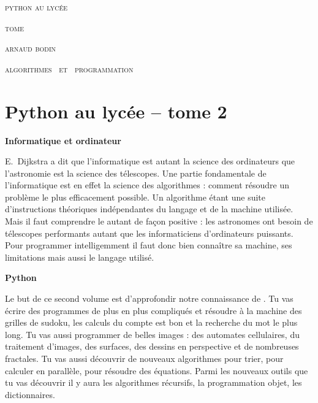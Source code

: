 
\pagestyle{empty}\thispagestyle{empty}
\vspace*{\fill}
\vspace*{5ex}
\begin{center}
	\fontsize{40}{40}\selectfont
	\textsc{python au lycée}
	
	\vspace*{-0.5ex}
	\textsc{\fontsize{24}{24}\selectfont tome \fontsize{22}{22}}
	
	\vspace*{2ex}
	
	\Large
	\textsc{arnaud bodin}

\end{center}
\vfill
\begin{center}
	\Large
	\textsc{algorithmes \  et \  programmation}
\end{center}
\begin{center}
\end{center}
\clearpage

\thispagestyle{empty}

\vspace*{\fill}
\section*{Python au lycée -- tome 2}



{\large\textbf{Informatique et ordinateur}}

E.~Dijkstra a dit que \og{}l'informatique est autant la science des ordinateurs que l'astronomie est la science des télescopes\fg{}. 
Une partie fondamentale de l'informatique est en effet la science des algorithmes :
comment résoudre un problème le plus efficacement possible.
Un algorithme étant une suite d'instructions théoriques indépendantes du langage et de la machine utilisée.
Mais il faut comprendre le \og{}autant\fg{} de façon positive : les astronomes ont besoin de télescopes performants  autant que les informaticiens d'ordinateurs puissants. Pour programmer intelligemment il faut donc bien connaître sa machine, ses limitations mais aussi le langage utilisé.

 
\bigskip

{\large\textbf{Python}}

Le but de ce second volume est d'approfondir notre connaissance de \Python{}. Tu vas écrire des programmes de plus en plus compliqués et résoudre à la machine des grilles de sudoku, les calculs du \og{}compte est bon\fg{} et la recherche du \og{}mot le plus long\fg{}. Tu vas aussi programmer de belles images : des automates cellulaires, du traitement d'images, des surfaces, des dessins en perspective et de nombreuses fractales.
Tu vas aussi découvrir de nouveaux algorithmes pour trier, pour calculer en parallèle, pour résoudre des équations. Parmi les nouveaux outils que tu vas découvrir il y aura les algorithmes récursifs, la programmation objet, les dictionnaires.

